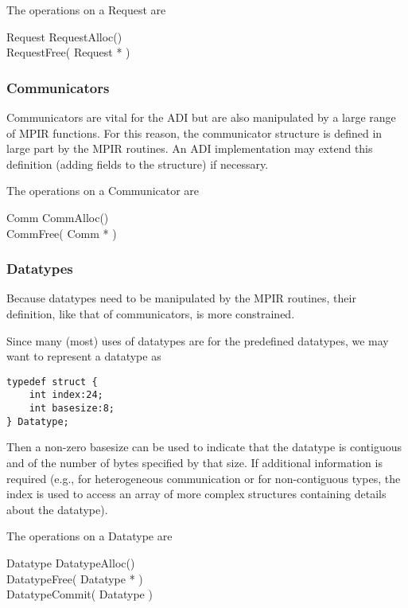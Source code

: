 \documentclass{article}
\begin{document}
The operations on a Request are
\begin{description}
\item[Request RequestAlloc()]
\item[RequestFree( Request * )]
\end{description}

\subsubsection{Communicators}
Communicators are vital for the ADI but are also manipulated by a large range
of MPIR functions.  For this reason, the communicator structure is defined in
large part by the MPIR routines.  An ADI implementation may extend this
definition (adding fields to the structure) if necessary.

The operations on a Communicator are
\begin{description}
\item[Comm CommAlloc()]
\item[CommFree( Comm * )]
\end{description}

\subsubsection{Datatypes}
Because datatypes need to be manipulated by the MPIR routines, their
definition, like that of communicators, is more constrained.

Since many (most) uses of datatypes are for the predefined datatypes, we may
want to represent a datatype as 
\begin{verbatim}
typedef struct {
    int index:24;
    int basesize:8;
} Datatype;
\end{verbatim}
Then a non-zero basesize can be used to indicate that the datatype is
contiguous and of the number of bytes specified by that size.  If additional
information is required (e.g., for heterogeneous communication or for
non-contiguous types, the index is used to access an array of more complex
structures containing details about the datatype).

The operations on a Datatype are
\begin{description}
\item[Datatype DatatypeAlloc()]
\item[DatatypeFree( Datatype * )]
\item[DatatypeCommit( Datatype )]
\end{description}
\end{document}
